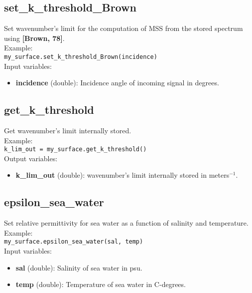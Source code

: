 \subsection{set\_k\_threshold\_Brown}

Set wavenumber's limit for the computation of MSS from the stored spectrum using {\bf [Brown, 78]}.\\

Example:\\

\texttt{my\_surface.set\_k\_threshold\_Brown(incidence)}\\

Input variables:
\begin{itemize}
\item {\bf incidence} (double): Incidence angle of incoming signal in degrees.
\end{itemize}


\subsection{get\_k\_threshold}

Get wavenumber's limit internally stored.\\

Example:\\

\texttt{k\_lim\_out = my\_surface.get\_k\_threshold()}\\

Output variables:
\begin{itemize}
\item {\bf k\_lim\_out} (double): wavenumber's limit internally stored in meters$^{-1}$.
\end{itemize}


\subsection{epsilon\_sea\_water}

Set relative permittivity for sea water as a function of salinity and temperature.\\

Example:\\

\texttt{my\_surface.epsilon\_sea\_water(sal, temp)}\\

Input variables:
\begin{itemize}
\item {\bf sal} (double): Salinity of sea water in psu.
\item {\bf temp} (double): Temperature of sea water in C-degrees.
\end{itemize}


